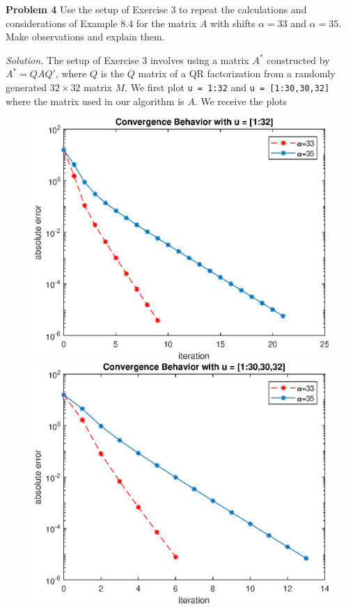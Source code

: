 \documentclass[12pt]{article}
\newcommand{\problem}[1]{\hspace{-4 ex} \large \textbf{Problem #1} }
\newcommand{\solution}{\vspace{2 ex} \hspace{-5 ex} \emph{Solution.} }
\begin{document}
\bigbreak

\problem{4} Use the setup of Exercise 3 to repeat the calculations and considerations of Example 8.4 for the matrix $ A $ with shifts $ \alpha = 33 $
and $ \alpha = 35 $. Make observations and explain them.

\solution The setup of Exercise 3 involves using a matrix $ A^* $ constructed by $ A^* = QAQ' $, where $ Q $ is the $ Q $ matrix of a QR factorization from a randomly generated $ 32 \times 32 $ matrix $ M $. We first plot \texttt{u = 1:32} and \texttt{u = [1:30,30,32]} where the matrix used in our algorithm is $ A $. We receive the plots
\begin{figure}[H]
	\centering
	\begin{minipage}[b]{0.4\textwidth}
		\includegraphics[width=\textwidth]{hw3p4p1.eps}
	\end{minipage}
	\hfill
	\begin{minipage}[b]{0.4\textwidth}
		\includegraphics[width=\textwidth]{hw3p4p2.eps}
	\end{minipage}
\end{figure}
\end{document}
